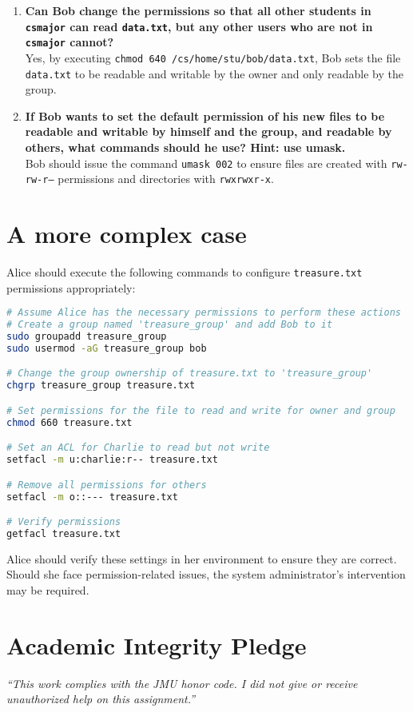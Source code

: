 \documentclass{article}
\begin{document}
\begin{enumerate}
    \item \textbf{Can Bob change the permissions so that all other students in \texttt{csmajor} can read \texttt{data.txt}, but any other users who are not in \texttt{csmajor} cannot?}\\
    Yes, by executing \texttt{chmod 640 /cs/home/stu/bob/data.txt}, Bob sets the file \texttt{data.txt} to be readable and writable by the owner and only readable by the group.
    
    \item \textbf{If Bob wants to set the default permission of his new files to be readable and writable by himself and the group, and readable by others, what commands should he use? Hint: use umask.}\\
    Bob should issue the command \texttt{umask 002} to ensure files are created with \texttt{rw-rw-r--} permissions and directories with \texttt{rwxrwxr-x}.
\end{enumerate}

\section*{A more complex case}

Alice should execute the following commands to configure \texttt{treasure.txt} permissions appropriately:

\begin{lstlisting}[language=bash]
# Assume Alice has the necessary permissions to perform these actions
# Create a group named 'treasure_group' and add Bob to it
sudo groupadd treasure_group
sudo usermod -aG treasure_group bob

# Change the group ownership of treasure.txt to 'treasure_group'
chgrp treasure_group treasure.txt

# Set permissions for the file to read and write for owner and group
chmod 660 treasure.txt

# Set an ACL for Charlie to read but not write
setfacl -m u:charlie:r-- treasure.txt

# Remove all permissions for others
setfacl -m o::--- treasure.txt

# Verify permissions
getfacl treasure.txt
\end{lstlisting}

Alice should verify these settings in her environment to ensure they are correct. Should she face permission-related issues, the system administrator’s intervention may be required.

\vfill
  \section*{Academic Integrity Pledge}
    {\color{red}\textit{“This work complies with the JMU honor code. I did not give or receive unauthorized help on this assignment.”}}
\end{document}
